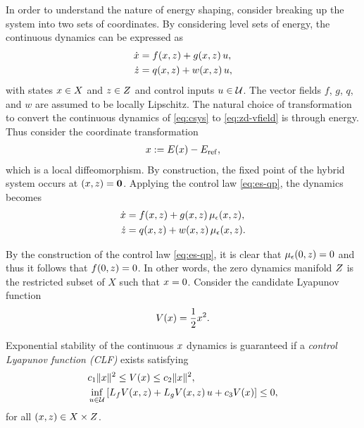 \documentclass[twocolumn]{article}
\begin{document}
In order to understand the nature of energy shaping, consider breaking up the system into two sets of coordinates.
%
By considering level sets of energy, the continuous dynamics can be expressed as
\begin{align}
  \nonumber
  \dot {x} &= f(x, z) + g(x, z) \, u,\\
  \dot {z} &= q(x, z) + w(x, z) \, u,
  \label{eq:zd-vfield}
\end{align}
%
with states $x \in X$ and $z \in Z$ and control inputs $u \in \mathcal{U}$.
%
The vector fields $f$, $g$, $q$, and $w$ are assumed to be locally Lipschitz.
%
The natural choice of transformation to convert the continuous dynamics of \eqref{eq:csys} to \eqref{eq:zd-vfield} is through energy.
%
Thus consider the coordinate transformation
\begin{align}
  x := E(x) - E_{\mathrm{ref}},
\end{align}
which is a local diffeomorphism.
%
By construction, the fixed point of the hybrid system occurs at $(x, z) = \mathbf{0}$.
%
Applying the control law \eqref{eq:es-qp}, the dynamics becomes
\begin{align}
  \nonumber
  \dot {x} &= f(x, z) + g(x, z) \, \mu_{\epsilon}(x, z),\\
  \dot {z} &= q(x, z) + w(x, z) \, \mu_{\epsilon}(x, z).
  \label{eq:zd-vfield-cl}
\end{align}

By the construction of the control law \eqref{eq:es-qp}, it is clear that $\mu_{\epsilon}(0, z) = 0$ and thus it follows that $f(0, z) = 0$.
%
In other words, the zero dynamics manifold $Z$ is the restricted subset of $X$ such that $x = 0$.
%
Consider the candidate Lyapunov function
\begin{align}
  V(x) = \frac{1}{2} x^{2}.
\end{align}

\begin{proposition}  
  Exponential stability of the continuous $x$ dynamics is guaranteed if a {\em control Lyapunov function (CLF)} exists satisfying
  \begin{align}
    \label{eq:lyap-cond-nrg-es}
    &c_{1} \| x \|^{2} \leq V(x) \leq c_{2} \| x \|^2,\\
    \nonumber
    &\inf_{u \in \mathcal{U}} \left[ L_{f} V(x, z) + L_{g} V(x, z) \, u + c_{3} V(x) \right] \leq 0,
  \end{align}
  for all $(x, z) \in X \times Z$.
\end{proposition}
\end{document}
